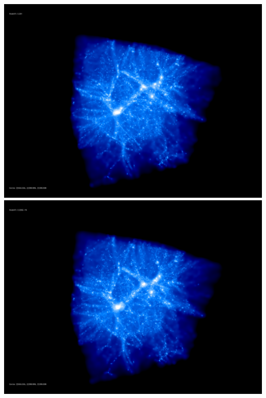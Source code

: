 \includegraphics[scale=0.1]{r256/stages_52/150.jpg} 
\includegraphics[scale=0.1]{r256/stages_52/198.jpg}  \\

